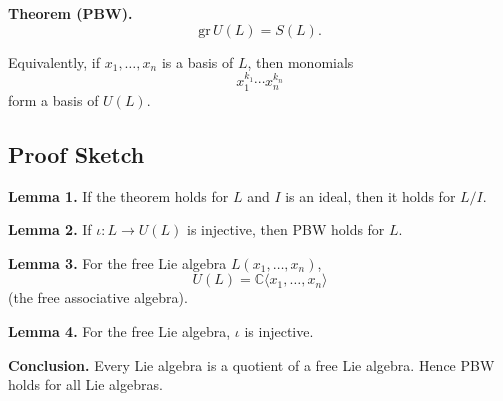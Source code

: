 \textbf{Theorem (PBW).}
\[
\mathrm{gr}\,U(L) = S(L).
\]

Equivalently, if $x_1,\dots,x_n$ is a basis of $L$, then
monomials
\[
x_1^{k_1}\cdots x_n^{k_n}
\]
form a basis of $U(L)$.

\subsection*{Proof Sketch}

\textbf{Lemma 1.}
If the theorem holds for $L$ and $I$ is an ideal, then it holds for $L/I$.

\textbf{Lemma 2.}
If $\iota : L \to U(L)$ is injective, then PBW holds for $L$.

\textbf{Lemma 3.}
For the free Lie algebra $L(x_1,\dots,x_n)$,
\[
U(L) = \mathbb{C}\langle x_1,\dots,x_n\rangle
\]
(the free associative algebra).

\textbf{Lemma 4.}
For the free Lie algebra, $\iota$ is injective.

\textbf{Conclusion.}
Every Lie algebra is a quotient of a free Lie algebra.
Hence PBW holds for all Lie algebras.